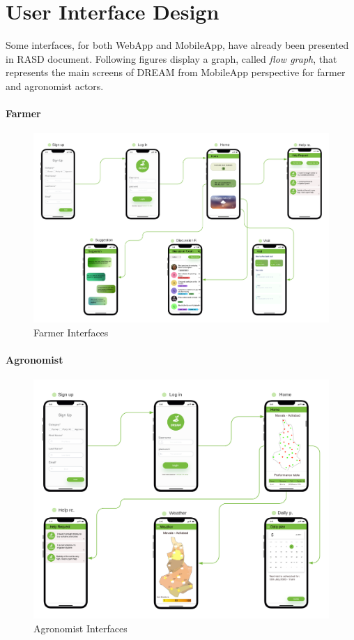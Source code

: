 \chapter{User Interface Design}
Some interfaces, for both WebApp and MobileApp, have already been presented in RASD document.\newline
Following figures display a graph, called \textit{flow graph}, that represents the main screens of DREAM from MobileApp perspective for farmer and agronomist actors.


\subsubsection{Farmer}

\begin{figure}[H]
   \centering
  \centerline{\includegraphics[width=150mm,scale=0.9]{./Images//Mocks/Mobile_farmer/Blank diagram.png}}
  \caption{Farmer Interfaces}
\end{figure}


\subsubsection{Agronomist}

\begin{figure}[H]
   \centering
  \centerline{\includegraphics[width=150mm,scale=0.9]{./Images//Mocks/Mobile_agronomist/Agronomist.png}}
  \caption{Agronomist Interfaces}
\end{figure}